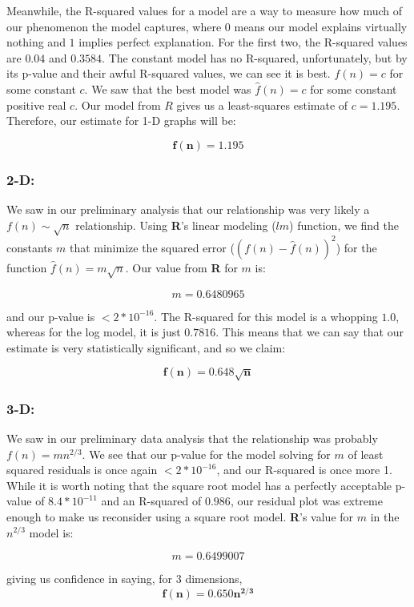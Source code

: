\documentclass[conference]{styles/acmsiggraph}
\newcommand{\?}{\stackrel{?}{=}}
\begin{document}
Meanwhile, the R-squared values for a model are a way to measure how much of our phenomenon the model captures, where $0$ means our model explains virtually nothing and $1$ implies perfect explanation.  For the first two, the R-squared values are $0.04$ and $0.3584$.  The constant model has no R-squared, unfortunately, but by its p-value and their awful R-squared values, we can see it is best.  $f(n) = c$ for some constant $c$.  
We saw that the best model was $\hat{f}(n) = c$ for some constant positive real $c$.  Our model from $R$ gives us a least-squares estimate of $c=1.195$.  Therefore, our estimate for 1-D graphs will be:

$$\mathbf{f(n) = 1.195}$$  


\subsubsection{2-D:}

We saw in our preliminary analysis that our relationship was very likely a $f(n)\sim \sqrt{n}$ relationship.  Using \textbf{R}'s linear modeling ($lm$) function, we find the constants $m$ that minimize the squared error ($(f(n)-\hat{f}(n))^2$) for the function $\hat{f}(n)=m\sqrt{n}$.  Our value from \textbf{R} for $m$ is:

$$m=0.6480965$$

and our p-value is $<2*10^{-16}$.  The R-squared for this model is a whopping $1.0$, whereas for the log model, it is just $0.7816$.  This means that we can say that our estimate is very statistically significant, and so we claim:

$$\mathbf{f(n) = 0.648\sqrt{n}}$$


\subsubsection{3-D:}
We saw in our preliminary data analysis that the relationship was probably $f(n) = mn^{2/3}$.  We see that our p-value for the model solving for $m$ of least squared residuals is once again $<2*10^{-16}$, and our R-squared is once more 1.  While it is worth noting that the square root model has a perfectly acceptable p-value of $8.4*10^{-11}$ and an R-squared of $0.986$, our residual plot was extreme enough to make us reconsider using a square root model.  \textbf{R}'s value for $m$ in the $n^{2/3}$ model is:

$$m = 0.6499007$$

giving us confidence in saying, for 3 dimensions, $$\mathbf{f(n) = 0.650n^{2/3}}$$
\end{document}
